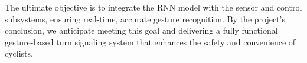 \documentclass[12pt]{article}
\begin{document}
The ultimate objective is to integrate the RNN model with the sensor and control subsystems, ensuring real-time, accurate gesture recognition. By the project's conclusion, we anticipate meeting this goal and delivering a fully functional gesture-based turn signaling system that enhances the safety and convenience of cyclists.
\newpage

\end{document}
